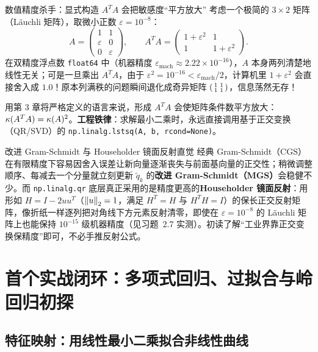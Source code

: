 \begin{failBox}{数值精度杀手：显式构造 $A^T A$ 会把敏感度“平方放大”}
考虑一个极简的 $3 \times 2$ 矩阵（Läuchli 矩阵），取微小正数 $\varepsilon = 10^{-8}$：
\[
A = \begin{pmatrix} 1 & 1 \\ \varepsilon & 0 \\ 0 & \varepsilon \end{pmatrix}, \qquad
A^T A = \begin{pmatrix} 1 + \varepsilon^2 & 1 \\ 1 & 1 + \varepsilon^2 \end{pmatrix}.
\]
在双精度浮点数 \texttt{float64} 中（机器精度 $\varepsilon_{\text{mach}} \approx 2.22 \times 10^{-16}$），$A$ 本身两列清楚地线性无关；可是一旦乘出 $A^T A$，由于 $\varepsilon^2 = 10^{-16} < \varepsilon_{\text{mach}}/2$，计算机里 $1 + \varepsilon^2$ 会直接舍入成 $1.0$！原本列满秩的问题瞬间退化成奇异矩阵 $\begin{psmallmatrix}1 & 1 \\ 1 & 1\end{psmallmatrix}$，信息荡然无存！

用第 3 章将严格定义的语言来说，形成 $A^T A$ 会使矩阵条件数平方放大：$\kappa(A^T A) = \kappa(A)^2$。\textbf{工程铁律}：求解最小二乘时，永远直接调用基于正交变换（QR/SVD）的 \texttt{np.linalg.lstsq(A, b, rcond=None)}。
\end{failBox}

\begin{extBox}{改进 Gram-Schmidt 与 Householder 镜面反射直觉}
经典 Gram-Schmidt（CGS）在有限精度下容易因舍入误差让新向量逐渐丧失与前面基向量的正交性；稍微调整顺序、每减去一个分量就立刻更新 $\tilde{q}_k$ 的\textbf{改进 Gram-Schmidt（MGS）}会稳健不少。而 \texttt{np.linalg.qr} 底层真正采用的是精度更高的\textbf{Householder 镜面反射}：用形如 $H = I - 2 u u^T$（$\left\|u\right\|_2 = 1$，满足 $H^T = H$ 与 $H^T H = I$）的保长正交反射矩阵，像折纸一样逐列把对角线下方元素反射清零，即使在 $\varepsilon = 10^{-8}$ 的 Läuchli 矩阵上也能保持 $10^{-15}$ 级机器精度（见习题~2.7 实测）。初读了解“工业界靠正交变换保精度”即可，不必手推反射公式。
\end{extBox}

\section{首个实战闭环：多项式回归、过拟合与岭回归初探}\label{sec:poly-ridge}

\subsection{特征映射：用线性最小二乘拟合非线性曲线}

